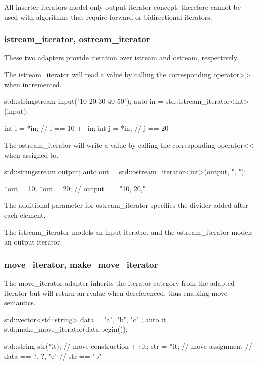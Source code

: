 All inserter iterators model only output iterator concept, therefore cannot be used with algorithms that require forward or bidirectional iterators.

\subsubsection{istream\_iterator, ostream\_iterator}

These two adapters provide iteration over istream and ostream, respectively.

The istream\_iterator will read a value by calling the corresponding operator>> when incremented.

\begin{box-note}
\begin{cppcode}
std::stringstream input("10 20 30 40 50");
auto in = std::istream_iterator<int>(input);

int i = *in; // i == 10
++in;
int j = *in; // j == 20
\end{cppcode}
\end{box-note}

The ostream\_iterator will write a value by calling the corresponding operator<< when assigned to.

\begin{box-note}
\begin{cppcode}
std::stringstream output;
auto out = std::ostream_iterator<int>(output, ", ");

*out = 10;
*out = 20;
// output == "10, 20,"
\end{cppcode}
\end{box-note}

The additional parameter for ostream\_iterator specifies the divider added after each element.

The istream\_iterator models an input iterator, and the ostream\_iterator models an output iterator.

\subsubsection{move\_iterator, make\_move\_iterator}

The move\_iterator adapter inherits the iterator category from the adapted iterator but will return an rvalue when dereferenced, thus enabling move semantics.

\begin{box-note}
\begin{cppcode}
std::vector<std::string> data = { "a", "b", "c" };
auto it = std::make_move_iterator(data.begin());

std::string str(*it); // move construction
++it;
str = *it; // move assignment
// data == { ?, ?, "c" }
// str == "b"
\end{cppcode}
\end{box-note}

